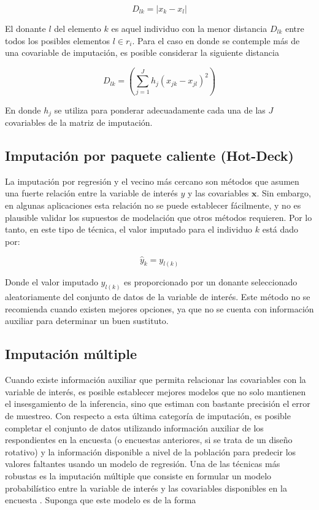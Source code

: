 \documentclass[
  12pt,
  spanish,
]{book}
\begin{document}
\[
D_{lk} = |x_k - x_l|
\]

El donante \(l\) del elemento \(k\) es aquel individuo con la menor distancia \(D_{lk}\) entre todos los posibles elementos \(l\in r_i\). Para el caso en donde se contemple más de una covariable de imputación, es posible considerar la siguiente distancia

\[
D_{lk} = \left( \sum_{j=1}^J h_j (x_{jk} - x_{jl})^2 \right)
\]

En donde \(h_j\) se utiliza para ponderar adecuadamente cada una de las \(J\) covariables de la matriz de imputación.

\hypertarget{imputaciuxf3n-por-paquete-caliente-hot-deck}{%
\subsection{Imputación por paquete caliente (Hot-Deck)}\label{imputaciuxf3n-por-paquete-caliente-hot-deck}}

La imputación por regresión y el vecino más cercano son métodos que asumen una fuerte relación entre la variable de interés \(y\) y las covariables \(\mathbf{x}\). Sin embargo, en algunas aplicaciones esta relación no se puede establecer fácilmente, y no es plausible validar los supuestos de modelación que otros métodos requieren. Por lo tanto, en este tipo de técnica, el valor imputado para el individuo \(k\) está dado por:

\[
\hat{y}_k = y_{l(k)}
\]

Donde el valor imputado \(y_{l(k)}\) es proporcionado por un donante seleccionado aleatoriamente del conjunto de datos de la variable de interés. Este método no se recomienda cuando existen mejores opciones, ya que no se cuenta con información auxiliar para determinar un buen sustituto.

\hypertarget{imputaciuxf3n-muxfaltiple}{%
\subsection{Imputación múltiple}\label{imputaciuxf3n-muxfaltiple}}

Cuando existe información auxiliar que permita relacionar las covariables con la variable de interés, es posible establecer mejores modelos que no solo mantienen el insesgamiento de la inferencia, sino que estiman con bastante precisión el error de muestreo. Con respecto a esta última categoría de imputación, es posible completar el conjunto de datos utilizando información auxiliar de los respondientes en la encuesta (o encuestas anteriores, si se trata de un diseño rotativo) y la información disponible a nivel de la población para predecir los valores faltantes usando un modelo de regresión. Una de las técnicas más robustas es la imputación múltiple que consiste en formular un modelo probabilístico entre la variable de interés y las covariables disponibles en la encuesta \citep{Rubin_1987}. Suponga que este modelo es de la forma
\end{document}
